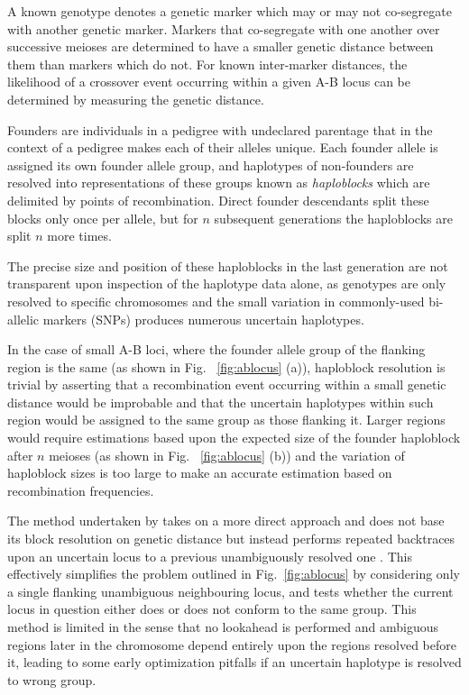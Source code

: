 \enlargethispage{20pt}
A known genotype denotes a genetic marker which may or may not co-segregate with another genetic marker. Markers that co-segregate with one another over successive meioses are determined to have a smaller genetic distance between them than markers which do not. For known inter-marker distances, the likelihood of a crossover event occurring within a given A-B locus can be determined by measuring the genetic distance.


Founders are individuals in a pedigree with undeclared parentage that in the context of a pedigree makes each of their alleles unique. Each founder allele is assigned its own founder allele group, and haplotypes of non-founders are resolved into representations of these groups known as \textit{haploblocks} which are delimited by points of recombination. Direct founder descendants split these blocks only once per allele, but for $n$ subsequent generations the haploblocks are split $n$ more times.

The precise size and position of these haploblocks in the last generation are not transparent upon inspection of the haplotype data alone, as genotypes are only resolved to specific chromosomes and the small variation in commonly-used bi-allelic markers (SNPs) produces numerous uncertain haplotypes.\

In the case of small A-B loci, where the founder allele group of the flanking region is the same (as shown in Fig. ~\ref{fig:ablocus} (a)), haploblock resolution is trivial by asserting that a recombination event occurring within a small genetic distance would be improbable and that the uncertain haplotypes within such region would be assigned to the same group as those flanking it. Larger regions would require estimations based upon the expected size of the founder haploblock after $n$ meioses (as shown in Fig. ~\ref{fig:ablocus} (b)) and the variation of haploblock sizes is too large to make an accurate estimation based on recombination frequencies.

The method undertaken by \app takes on a more direct approach and does not base its block resolution on genetic distance but instead performs repeated backtraces upon an uncertain locus to a previous unambiguously resolved one \citep{hpaint,hpaintmanual}. This effectively simplifies the problem outlined in Fig.~\ref{fig:ablocus} by considering only a single flanking unambiguous neighbouring locus, and tests whether the current locus in question either does or does not conform to the same group. This method is limited in the sense that no lookahead is performed and ambiguous regions later in the chromosome depend entirely upon the regions resolved before it, leading to some early optimization pitfalls if an uncertain haplotype is resolved to wrong group.

